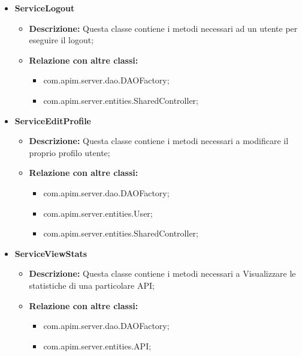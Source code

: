 {{{{\begin{itemize}
\begin{itemize}
\begin{itemize}
              \item com.apim.server.entities.API;
              \item com.apim.server.entities.SharedController;
            \end{itemize}
          \end{itemize}
          \item \textbf{ServiceLogout}
          \begin{itemize}
            \item \textbf{Descrizione:} Questa classe contiene i metodi necessari ad un utente per eseguire il logout;
            \item \textbf{Relazione con altre classi:}
            \begin{itemize}
              \item com.apim.server.dao.DAOFactory;
              \item com.apim.server.entities.SharedController;
            \end{itemize}
          \end{itemize}
          \item \textbf{ServiceEditProfile}
          \begin{itemize}
            \item \textbf{Descrizione:} Questa classe contiene i metodi necessari a modificare il proprio profilo utente;
            \item \textbf{Relazione con altre classi:}
            \begin{itemize}
              \item com.apim.server.dao.DAOFactory;
              \item com.apim.server.entities.User;
              \item com.apim.server.entities.SharedController;
            \end{itemize}
          \end{itemize}
          \item \textbf{ServiceViewStats}
          \begin{itemize}
            \item \textbf{Descrizione:} Questa classe contiene i metodi necessari a Visualizzare le statistiche di una particolare API;
            \item \textbf{Relazione con altre classi:}
            \begin{itemize}
              \item com.apim.server.dao.DAOFactory;
              \item com.apim.server.entities.API;

\end{itemize}
\end{itemize}
\end{itemize}}}}}
